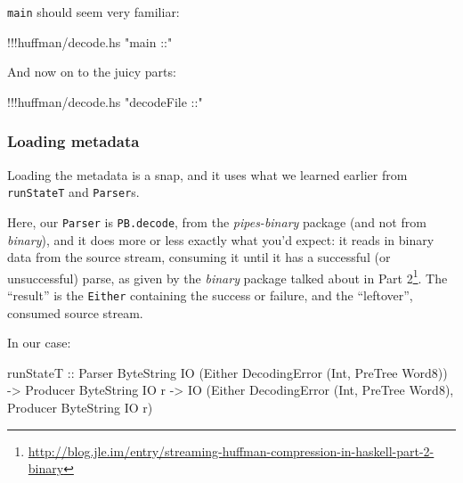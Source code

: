 \documentclass[]{article}
\newenvironment{Shaded}{}{}
\newcommand{\DataTypeTok}[1]{\textcolor[rgb]{0.56,0.13,0.00}{{#1}}}
\newcommand{\StringTok}[1]{\textcolor[rgb]{0.25,0.44,0.63}{{#1}}}
\newcommand{\OtherTok}[1]{\textcolor[rgb]{0.00,0.44,0.13}{{#1}}}
\newcommand{\FunctionTok}[1]{\textcolor[rgb]{0.02,0.16,0.49}{{#1}}}
\newcommand{\NormalTok}[1]{{#1}}
\renewcommand{\href}[2]{#2\footnote{\url{#1}}}
\begin{document}
\texttt{main} should seem very familiar:

\begin{Shaded}
\begin{Highlighting}[]
\FunctionTok{!!!}\NormalTok{huffman}\FunctionTok{/}\NormalTok{decode}\FunctionTok{.}\NormalTok{hs }\StringTok{"main ::"}
\end{Highlighting}
\end{Shaded}

And now on to the juicy parts:

\begin{Shaded}
\begin{Highlighting}[]
\FunctionTok{!!!}\NormalTok{huffman}\FunctionTok{/}\NormalTok{decode}\FunctionTok{.}\NormalTok{hs }\StringTok{"decodeFile ::"}
\end{Highlighting}
\end{Shaded}

\subsubsection{Loading metadata}\label{loading-metadata}

Loading the metadata is a snap, and it uses what we learned earlier from
\texttt{runStateT} and \texttt{Parser}s.

Here, our \texttt{Parser} is \texttt{PB.decode}, from the
\emph{pipes-binary} package (and not from \emph{binary}), and it does
more or less exactly what you'd expect: it reads in binary data from the
source stream, consuming it until it has a successful (or unsuccessful)
parse, as given by the \emph{binary} package talked about in
\href{http://blog.jle.im/entry/streaming-huffman-compression-in-haskell-part-2-binary}{Part
2}. The ``result'' is the \texttt{Either} containing the success or
failure, and the ``leftover'', consumed source stream.

In our case:

\begin{Shaded}
\begin{Highlighting}[]
\NormalTok{runStateT}
\OtherTok{  ::} \DataTypeTok{Parser}   \DataTypeTok{ByteString} \DataTypeTok{IO} \NormalTok{(}\DataTypeTok{Either} \DataTypeTok{DecodingError} \NormalTok{(}\DataTypeTok{Int}\NormalTok{, }\DataTypeTok{PreTree} \DataTypeTok{Word8}\NormalTok{))}
  \OtherTok{->} \DataTypeTok{Producer} \DataTypeTok{ByteString} \DataTypeTok{IO} \NormalTok{r}
  \OtherTok{->} \DataTypeTok{IO} \NormalTok{(}\DataTypeTok{Either} \DataTypeTok{DecodingError} \NormalTok{(}\DataTypeTok{Int}\NormalTok{, }\DataTypeTok{PreTree} \DataTypeTok{Word8}\NormalTok{), }\DataTypeTok{Producer} \DataTypeTok{ByteString} \DataTypeTok{IO} \NormalTok{r)}
\end{Highlighting}
\end{Shaded}
\end{document}

